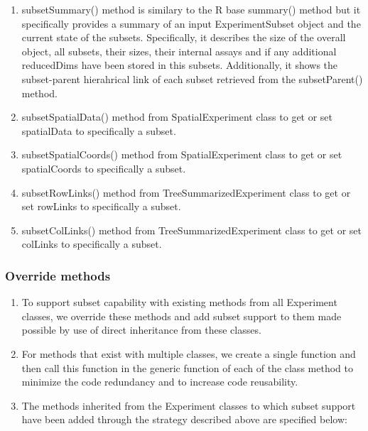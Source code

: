 \documentclass[
]{article}
\providecommand{\tightlist}{%
  \setlength{\itemsep}{0pt}\setlength{\parskip}{0pt}}
\begin{document}
\begin{enumerate}
\item
  subsetSummary() method is similary to the R base summary() method but
  it specifically provides a summary of an input ExperimentSubset object
  and the current state of the subsets. Specifically, it describes the
  size of the overall object, all subsets, their sizes, their internal
  assays and if any additional reducedDims have been stored in this
  subsets. Additionally, it shows the subset-parent hierahrical link of
  each subset retrieved from the subsetParent() method.
\item
  subsetSpatialData() method from SpatialExperiment class to get or set
  spatialData to specifically a subset.
\item
  subsetSpatialCoords() method from SpatialExperiment class to get or
  set spatialCoords to specifically a subset.
\item
  subsetRowLinks() method from TreeSummarizedExperiment class to get or
  set rowLinks to specifically a subset.
\item
  subsetColLinks() method from TreeSummarizedExperiment class to get or
  set colLinks to specifically a subset.
\end{enumerate}

\hypertarget{override-methods}{%
\subsubsection{Override methods}\label{override-methods}}

\begin{enumerate}
\def\labelenumi{\arabic{enumi}.}
\tightlist
\item
  To support subset capability with existing methods from all Experiment
  classes, we override these methods and add subset support to them made
  possible by use of direct inheritance from these classes.
\item
  For methods that exist with multiple classes, we create a single
  function and then call this function in the generic function of each
  of the class method to minimize the code redundancy and to increase
  code reusability.
\item
  The methods inherited from the Experiment classes to which subset
  support have been added through the strategy described above are
  specified below:
\end{enumerate}
\end{document}
